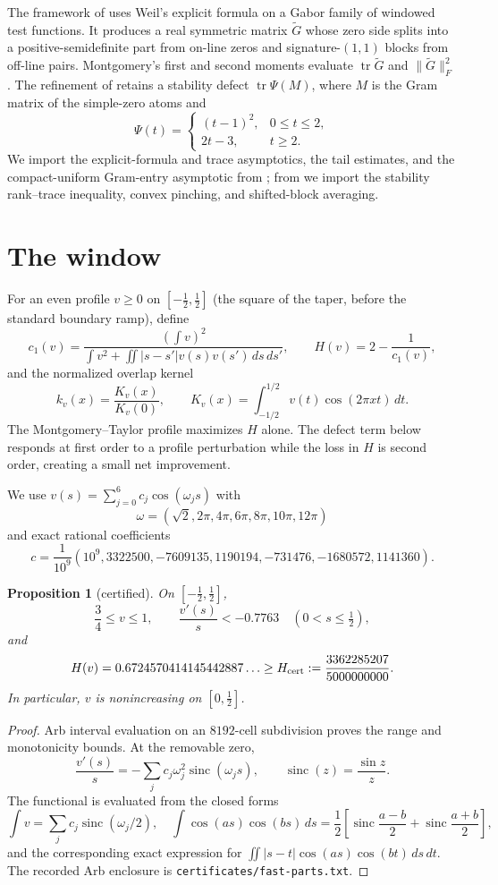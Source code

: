 \documentclass[11pt]{article}
\newtheorem{proposition}[theorem]{Proposition}
\theoremstyle{remark}
\newcommand{\tr}{\operatorname{tr}}
\begin{document}
The framework of \cite{Claude2026,Ainta2026} uses Weil's explicit formula on
a Gabor family of windowed test functions.  It produces a real symmetric
matrix $\widetilde G$ whose zero side splits into a positive-semidefinite part
from on-line zeros and signature-$(1,1)$ blocks from off-line pairs.
Montgomery's first and second moments evaluate $\tr\widetilde G$ and
$\|\widetilde G\|_F^2$.  The refinement of \cite{Ainta2026} retains a
stability defect $\tr\Psi(M)$, where $M$ is the Gram matrix of the simple-zero
atoms and
\[
\Psi(t)=
\begin{cases}
(t-1)^2,&0\le t\le2,\\
2t-3,&t\ge2.
\end{cases}
\]
We import the explicit-formula and trace asymptotics, the tail estimates, and
the compact-uniform Gram-entry asymptotic from \cite{Claude2026}; from
\cite{Ainta2026} we import the stability rank--trace inequality,
convex pinching, and shifted-block averaging.

\section{The window}\label{sec:window}

For an even profile $v\ge0$ on $[-\tfrac12,\tfrac12]$ (the square of the
taper, before the standard boundary ramp), define
\[
c_1(v)=\frac{(\int v)^2}
{\int v^2+\iint|s-s'|v(s)v(s')\,ds\,ds'},
\qquad H(v)=2-\frac1{c_1(v)},
\]
and the normalized overlap kernel
\[
k_v(x)=\frac{K_v(x)}{K_v(0)},\qquad
K_v(x)=\int_{-1/2}^{1/2}v(t)\cos(2\pi xt)\,dt.
\]
The Montgomery--Taylor profile maximizes $H$ alone.  The defect term below
responds at first order to a profile perturbation while the loss in $H$ is
second order, creating a small net improvement.

We use $v(s)=\sum_{j=0}^{6}c_j\cos(\omega_js)$ with
\[
\omega=(\sqrt2,2\pi,4\pi,6\pi,8\pi,10\pi,12\pi)
\]
and exact rational coefficients
\[
c=\frac1{10^9}
(10^9,3322500,-7609135,1190194,-731476,-1680572,1141360).
\]

\begin{proposition}[certified]\label{prop:window}
On $[-\tfrac12,\tfrac12]$,
\[
\frac34\le v\le1,
\qquad \frac{v'(s)}s<-0.7763\quad(0<s\le\tfrac12),
\]
and
\[
H(v)=0.6724570414145442887\ldots
\ge H_{\rm cert}:=\frac{3362285207}{5000000000}.
\]
In particular, $v$ is nonincreasing on $[0,\tfrac12]$.
\end{proposition}

\begin{proof}
Arb interval evaluation on an $8192$-cell subdivision proves the range and
monotonicity bounds.  At the removable zero,
\[
\frac{v'(s)}s=-\sum_jc_j\omega_j^2\operatorname{sinc}(\omega_js),
\qquad \operatorname{sinc}(z)=\frac{\sin z}{z}.
\]
The functional is evaluated from the closed forms
\[
\int v=\sum_jc_j\operatorname{sinc}(\omega_j/2),
\quad
\int\cos(as)\cos(bs)\,ds=\frac12\left[
\operatorname{sinc}\frac{a-b}{2}+\operatorname{sinc}\frac{a+b}{2}
\right],
\]
and the corresponding exact expression for
$\iint|s-t|\cos(as)\cos(bt)\,ds\,dt$.  The recorded Arb enclosure is
\texttt{certificates/fast-parts.txt}.
\end{proof}
\end{document}
